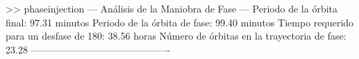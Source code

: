 >> phaseinjection
--- Análisis de la Maniobra de Fase ---
Periodo de la órbita final: 97.31 minutos
Periodo de la órbita de fase: 99.40 minutos
Tiempo requerido para un desfase de 180: 38.56 horas
Número de órbitas en la trayectoria de fase: 23.28
-------------------------------------------
